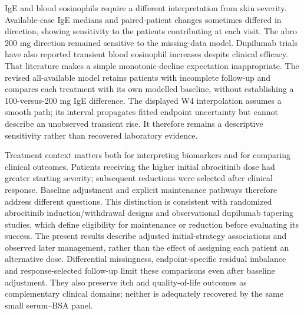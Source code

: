 \documentclass[10pt,a4paper]{article}
\begin{document}
IgE and blood eosinophils require a different interpretation from skin severity. Available-case IgE medians and paired-patient changes sometimes differed in direction, showing sensitivity to the patients contributing at each visit. The abro 200 mg direction remained sensitive to the missing-data model. Dupilumab trials have also reported transient blood eosinophil increases despite clinical efficacy.\citep{wechsler2022eosinophils} That literature makes a simple monotonic-decline expectation inappropriate. The revised all-available model retains patients with incomplete follow-up and compares each treatment with its own modelled baseline, without establishing a 100-versus-200 mg IgE difference. The displayed W4 interpolation assumes a smooth path; its interval propagates fitted endpoint uncertainty but cannot describe an unobserved transient rise. It therefore remains a descriptive sensitivity rather than recovered laboratory evidence.

Treatment context matters both for interpreting biomarkers and for comparing clinical outcomes. Patients receiving the higher initial abrocitinib dose had greater starting severity; subsequent reductions were selected after clinical response. Baseline adjustment and explicit maintenance pathways therefore address different questions. This distinction is consistent with randomized abrocitinib induction/withdrawal designs and observational dupilumab tapering studies, which define eligibility for maintenance or reduction before evaluating its success.\citep{blauvelt2022regimen,spekhorst2023} The present results describe adjusted initial-strategy associations and observed later management, rather than the effect of assigning each patient an alternative dose. Differential missingness, endpoint-specific residual imbalance and response-selected follow-up limit these comparisons even after baseline adjustment. They also preserve itch and quality-of-life outcomes as complementary clinical domains; neither is adequately recovered by the same small serum--BSA panel.
\end{document}
